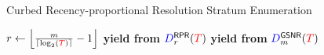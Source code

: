 \begin{algorithm}
\caption{Curbed Recency-proportional Resolution Stratum Enumeration}
\label{alg:curbed-recency-proportional-algo-enum-retained-ranks}
\begin{algorithmic}[1]
\Ensure{ $\colorTbar \in [0 \twodots \colorT)$ -- data items to drop, if any }
\State $r \gets \left\lfloor \frac{m}{\left\lceil \log_2(\colorT) \right\rceil} - 1 \right\rfloor$
  \State \textbf{yield from} $\colorD^{\mathsf{RPR}}_r(\colorT)$
\Else
  \State \textbf{yield from} $\colorD^{\mathsf{GSNR}}_m(\colorT)$
\EndIf
\end{algorithmic}
\end{algorithm}
